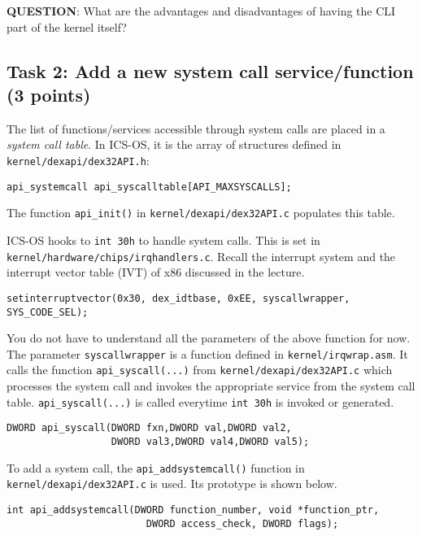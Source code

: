 \documentclass[a4paper, 11pt,oneside]{article}
\begin{document}
\textbf{QUESTION}: What are the advantages and disadvantages of having the CLI 
part of the kernel itself?

\subsection*{Task 2: Add a new system call service/function (3 points)}
The list of functions/services accessible through system calls are placed in a
\textit{system call table}. In ICS-OS, it is the array of structures 
defined in \texttt{kernel/dexapi/dex32API.h}: 

\begin{verbatim}
api_systemcall api_syscalltable[API_MAXSYSCALLS];
\end{verbatim}

The function \texttt{api\_init()} in \texttt{kernel/dexapi/dex32API.c}
populates this table. 

ICS-OS hooks to \texttt{int 30h} to handle system calls. This is set in
\texttt{kernel/hardware/chips/irqhandlers.c}. Recall the interrupt system 
and the interrupt vector table (IVT) of x86 discussed in the lecture.

\begin{verbatim}
setinterruptvector(0x30, dex_idtbase, 0xEE, syscallwrapper, SYS_CODE_SEL); 
\end{verbatim}

You do not have to understand all the parameters of the above function for now. 
The parameter \texttt{syscallwrapper} is a function defined in 
\texttt{kernel/irqwrap.asm}. It calls the function \texttt{api\_syscall(...)} 
from \texttt{kernel/dexapi/dex32API.c} which processes the system call and 
invokes the appropriate service from the system call table. 
\texttt{api\_syscall(...)} is called everytime \texttt{int 30h} is invoked or  
generated.

\begin{verbatim}
DWORD api_syscall(DWORD fxn,DWORD val,DWORD val2,
                  DWORD val3,DWORD val4,DWORD val5);
\end{verbatim}


To add a system call, the \texttt{api\_addsystemcall()} function in 
\texttt{kernel/dexapi/dex32API.c} is used. Its prototype is shown below.
\begin{verbatim}
int api_addsystemcall(DWORD function_number, void *function_ptr,
                        DWORD access_check, DWORD flags);
\end{verbatim}
\end{document}
